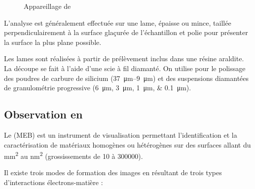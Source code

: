 \begin{figure}[htb]
  \caption{Appareillage de \CL}
  \label{fig:CL_app}
\end{figure}

L'analyse est généralement effectuée sur une lame, épaisse ou mince, 
taillée perpendiculairement à la surface glaçurée de l'échantillon 
et polie pour présenter la surface la plus plane possible.

Les lames sont réalisées à partir de prélèvement inclus dans une 
résine araldite. La découpe se fait à l'aide d'une scie à fil 
diamanté. On utilise pour le polissage des poudres de carbure 
de silicium (\SIrange[range-phrase=\ et\ ]{37}{9}{\um}) et des
suspensions diamantées de granulométrie progressive 
(\SIlist{6;3;1;0.1}{\um}).

\subsection{Observation en \MEB[ie]}
Le \MEB (MEB) est un instrument de visualisation permettant 
l'identification et la caractérisation de matériaux homogènes 
ou hétérogènes sur des surfaces allant du \si{\mm\squared} au
\si{\nm\squared} (grossissements de \texttimes\num{10} à 
\texttimes\num{300000}).

Il existe trois modes de formation des images en \MEB[ie] résultant 
de trois types d'interactions électrons-matière :

